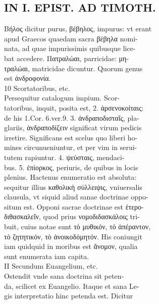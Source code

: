 \documentclass{article}
\begin{document}
\begin{pages}
\section*{IN I. EPIST. AD TIMOTH. \\
                }
Βήλος dicitur purus, βέβηλος, impurus: vt erant \\
                apud Graecos quaedam sacra βέβηλα nomi- \\
                nata, ad quae impurissimis quibusque lice- \\
                bat accedere. Πατραλώαι, parricidae: μη- \\
                τραλώαι, matricidae dicuntur. Quorum genus \\
                est ἀνδροφονία. \\
                10 Scortatoribus, etc. \\
                Persequitur catalogum impium. Scor- \\
                tatoribus, inquit, posita est, 2. ἀρσενοκοίταις: \\
                de his 1.Cor. 6.ver.9. 3. ἀνδραποδισταῖς, pla- \\
                glariis, ἀνδραποδίζειν significat virum pedicis \\
                irretire. Significans est scelus quo liberi ho- \\
                mines circunueniuntur, et per vim in serui- \\
                tutem rapiuntur. 4. ψεύσταις, mendaci- \\
                bus. 5. ἐπίορκος, periuris, de quibus in locis \\
                plenius. Hactenus enumeratio est absoluta: \\
                sequitur illius καθολικὴ σύλλειψις, vniuersalis \\
                clausula, vt siquid aliud sanae doctrinae oppo- \\
                situm est. Opponi sacrae doctrinae est ἑτερο- \\
                διθασκαλεῖν, quod prius νομοδιδασκάλοις tri- \\
                buit, cuius notae sunt τὸ μυθικόν, τὸ ἀπέραντον, \\
                τὸ  ζητητικόν, τὸ ἀνοικοδόμητόν. His coniungit \\
                iam quidquid in moribus est ἄνομον, qualia \\
                sunt enumerata iam capita. \\
                II Secundum Euangelium, etc. \\
                Ostendit vnde sana doctrina sit peten- \\
                da, scilicet ex Euangelio. Itaque et sana Le- \\
                gis interpretatio hinc petenda est. Dicitur \\
                

\end{pages}
\end{document}
